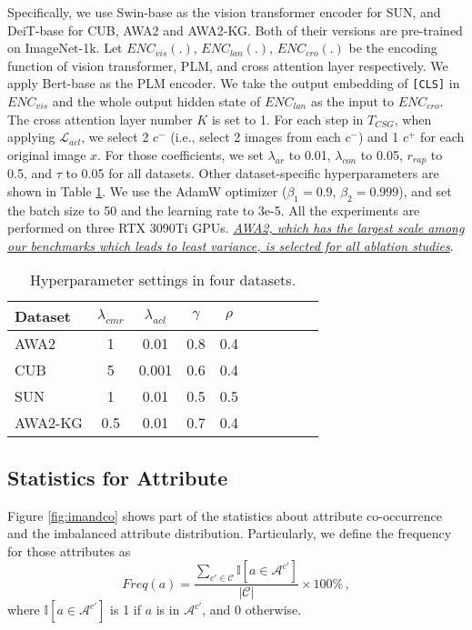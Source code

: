 \documentclass[letterpaper]{article} \usepackage{aaai23}  \usepackage{times}  \usepackage{helvet}  \usepackage{courier}  \usepackage[hyphens]{url}  \usepackage{graphicx} \urlstyle{rm} \def\UrlFont{\rm}  \usepackage{natbib}  \usepackage{caption} \frenchspacing  \setlength{\pdfpagewidth}{8.5in}  \setlength{\pdfpageheight}{11in}  \usepackage{algorithm}
\newcommand{\hyf}[1]{{\color{black}#1}}
\begin{document}
Specifically,
we use Swin-base \cite{DBLP:conf/iccv/LiuL00W0LG21} as the vision transformer encoder for SUN, and DeiT-base \cite{DBLP:conf/icml/TouvronCDMSJ21} for CUB, AWA2 and AWA2-KG.
Both of their versions are pre-trained on ImageNet-1k.
Let $ENC_{vis}(.)$, $ENC_{lan}(.)$, $ENC_{cro}(.)$ be the encoding function of vision transformer, PLM, and cross attention layer respectively. 
We apply Bert-base \cite{DBLP:conf/naacl/DevlinCLT19} as the PLM encoder.
We take the output embedding of {\tt [CLS]} in $ENC_{vis}$ and the whole output hidden state of $ENC_{lan}$ as the input to $ENC_{cro}$.
{The cross attention layer number} $K$ is set to 1. 
For each step in $T_{CSG}$, when applying $\mathcal{L}_{acl}$, we select 2 $c^-$ (i.e., select 2 images from each $c^-$) and 1 $c^+$ 
for {each}
original image $x$.
For those coefficients, we set $\lambda_{ar}$ to \hyf{0.01}, 
$\lambda_{con}$ to \hyf{0.05}, $r_{rap}$ to \hyf{0.5},  and $\tau$ to \hyf{0.05} for all datasets. Other dataset-specific hyperparameter{s} are shown in Table \ref{tab:hypdetail}.
We use {the} AdamW optimizer ($\beta_1 = 0.9$, $\beta_2 = 0.999$), and set the batch size to 50 {and the learning rate to 3e-5.} 
All the experiments are performed on three RTX 3090Ti GPUs.
\ul{\emph{AWA2, which has the largest scale among our benchmarks which leads to least variance, is selected for all ablation studies}}.
\begin{table}[htbp]
		\centering  
 		\small
		\caption{Hyperparameter settings in four datasets.
		}
		\vspace{-5pt}
		\begin{tabular}{lccccccccc}
        \toprule
        Dataset  & $\lambda_{cmr}$ & $\lambda_{acl}$ & $\gamma$ & $\rho$ \\
\midrule
        AWA2  & 1   & 0.01   & 0.8   & 0.4    \\
        CUB   & 5   & 0.001   & 0.6   & 0.4    \\
        SUN   & 1   & 0.01   & 0.5   & 0.5    \\
        AWA2-KG & 0.5   & 0.01   & 0.7   & 0.4   \\
\bottomrule
		\end{tabular} 
\label{tab:hypdetail}
		\vspace{-7pt}
\end{table}

\subsection{Statistics for Attribute}
Figure \ref{fig:imandco} shows part of the statistics 
{about} attribute co-occurrence and {the} imbalanced attribute  distribution.
Particularly, 
we define the frequency  for those attributes as 
\begin{equation}
    Freq(a) = \frac{\sum_{{c}\prime \in \mathcal{C}} \mathbb{I}{\left[a \in \mathcal{A}^{{c}\prime}\right]}}{|\mathcal{C}|} \times 100\% \,,
\end{equation}
where $\mathbb{I}{[ a \in \mathcal{A}^{{c}\prime} ]}$ is 1 if $a$ is in $\mathcal{A}^{{c}\prime}$, and 0 otherwise.
\end{document}
